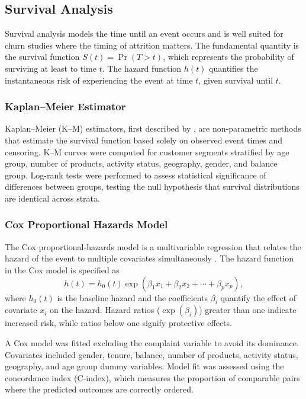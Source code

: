 \documentclass[12pt]{article}
\begin{document}
\subsection{Survival Analysis}
Survival analysis models the time until an event occurs and is well suited for churn studies where the timing of attrition matters. The fundamental quantity is the survival function \(S(t) = \Pr(T > t)\), which represents the probability of surviving at least to time \(t\). The hazard function \(h(t)\) quantifies the instantaneous risk of experiencing the event at time \(t\), given survival until \(t\).

\subsubsection{Kaplan–Meier Estimator}
Kaplan–Meier (K–M) estimators, first described by \citet{dudley2016kaplan}, are non‑parametric methods that estimate the survival function based solely on observed event times and censoring. K–M curves were computed for customer segments stratified by age group, number of products, activity status, geography, gender, and balance group. Log-rank tests were performed to assess statistical significance of differences between groups, testing the null hypothesis that survival distributions are identical across strata.

\subsubsection{Cox Proportional Hazards Model}
The Cox proportional‑hazards model is a multivariable regression that relates the hazard of the event to multiple covariates simultaneously \citep{sthda_cox}. The hazard function in the Cox model is specified as
\[ h(t) = h_0(t) \exp(\beta_1 x_1 + \beta_2 x_2 + \cdots + \beta_p x_p), \]
where \(h_0(t)\) is the baseline hazard and the coefficients \(\beta_i\) quantify the effect of covariate \(x_i\) on the hazard. Hazard ratios (\(\exp(\beta_i)\)) greater than one indicate increased risk, while ratios below one signify protective effects.

A Cox model was fitted excluding the complaint variable to avoid its dominance. Covariates included gender, tenure, balance, number of products, activity status, geography, and age group dummy variables. Model fit was assessed using the concordance index (C-index), which measures the proportion of comparable pairs where the predicted outcomes are correctly ordered.
\end{document}
